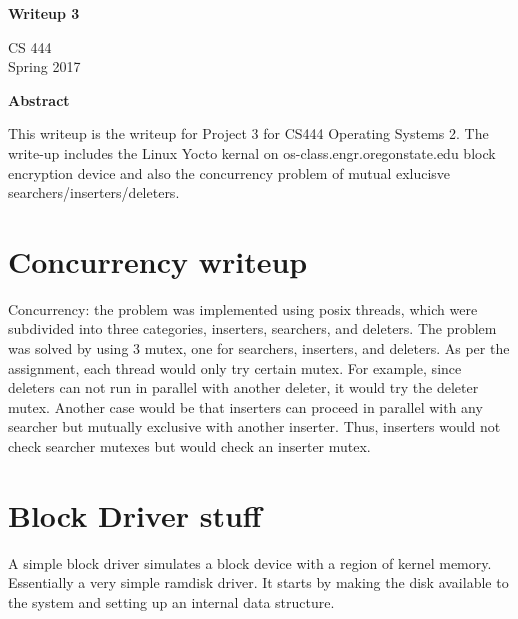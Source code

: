 \documentclass[letterpaper,10pt,titlepage]{article}
\begin{document}
\begin{titlepage}
    \begin{center}
        \vspace*{3.5cm}

        \textbf{Writeup 3}

        \vspace{0.5cm}
	
	\vspace{0.8cm}

        CS 444\\
        Spring 2017\\

        \vspace{1cm}

        \textbf{Abstract}\\

        \vspace{0.5cm}

	This writeup is the writeup for Project 3 for CS444 Operating Systems 2.  The write-up includes the Linux Yocto kernal on os-class.engr.oregonstate.edu block encryption device and also the concurrency problem of mutual exlucisve searchers/inserters/deleters.

        \vfill

    \end{center}
\end{titlepage}

\newpage

\tableofcontents

\newpage

\section{Concurrency writeup}
Concurrency: the problem was implemented using posix threads, which were subdivided into three categories, inserters, searchers, and deleters.  The problem was solved by using 3 mutex, one for searchers, inserters, and deleters.  As per the assignment, each thread would only try certain mutex.  For example, since deleters can not run in parallel with another deleter, it would try the deleter mutex.  Another case would be that inserters can proceed in parallel with any searcher but mutually exclusive with another inserter.  Thus, inserters would not check searcher mutexes but would check an inserter mutex.

\section{Block Driver stuff}
A simple block driver simulates a block device with a region of kernel memory.  Essentially a very simple ramdisk driver.  It starts by making the disk available to the system and setting up an internal data structure.
\end{document}
